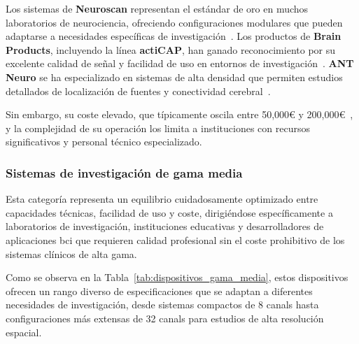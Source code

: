 Los sistemas de \textbf{Neuroscan} representan el estándar de oro en muchos laboratorios de neurociencia, ofreciendo configuraciones modulares que pueden adaptarse a necesidades específicas de investigación~\cite{neuroscan_systems}. Los productos de \textbf{Brain Products}, incluyendo la línea \textbf{actiCAP}, han ganado reconocimiento por su excelente calidad de señal y facilidad de uso en entornos de investigación~\cite{brainproducts_analyzer}. \textbf{ANT Neuro} se ha especializado en sistemas de alta densidad que permiten estudios detallados de localización de fuentes y conectividad cerebral~\cite{ant_neuro_systems}.

Sin embargo, su coste elevado, que típicamente oscila entre 50,000€ y 200,000€~\cite{brainproducts_analyzer,curry_neuroscan}, y la complejidad de su operación los limita a instituciones con recursos significativos y personal técnico especializado.

\subsubsection{Sistemas de investigación de gama media}
\label{subsubsec:sistemas_investigacion}

Esta categoría representa un equilibrio cuidadosamente optimizado entre capacidades técnicas, facilidad de uso y coste, dirigiéndose específicamente a laboratorios de investigación, instituciones educativas y desarrolladores de aplicaciones \acrshort{bci} que requieren calidad profesional sin el coste prohibitivo de los sistemas clínicos de alta gama.

Como se observa en la Tabla~\ref{tab:dispositivos_gama_media}, estos dispositivos ofrecen un rango diverso de especificaciones que se adaptan a diferentes necesidades de investigación, desde sistemas compactos de 8 \glspl{canal} hasta configuraciones más extensas de 32 \glspl{canal} para estudios de alta resolución espacial.

\begin{table}[h!]
\centering
{}
\caption{Comparativa de dispositivos \acrshort{eeg} de investigación de gama media}
\label{tab:dispositivos_gama_media}
\end{table}

